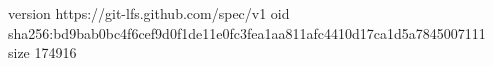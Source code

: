 version https://git-lfs.github.com/spec/v1
oid sha256:bd9bab0bc4f6cef9d0f1de11e0fc3fea1aa811afc4410d17ca1d5a7845007111
size 174916
